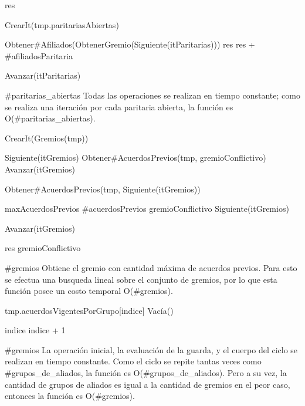 {
	\state res 		
	\state

	\state {} \asig CrearIt(tmp.paritariasAbiertas)		
						
		\state

		\state {} \asig Obtener\#Afiliados(ObtenerGremio(Siguiente(itParitarias)))		
		\state res \asig res + \#afiliadosParitaria		

		\state
		\state Avanzar(itParitarias)					
	\endwhile
}
{ \#paritarias\_abiertas }
{ Todas las operaciones se realizan en tiempo constante; como se realiza una iteración por cada paritaria abierta, la función es O(\#paritarias\_abiertas). }

{
	\state {} \asig CrearIt(Gremios(tmp))							
	\state

	\state {} \asig Siguiente(itGremios)							
	\state {} \asig Obtener\#AcuerdosPrevios(tmp, gremioConflictivo)				
	\state Avanzar(itGremios)																	
	\state

																	
		\state

		\state {} \asig Obtener\#AcuerdosPrevios(tmp, Siguiente(itGremios))		

									

			\state maxAcuerdosPrevios \asig \#acuerdosPrevios						
			\state gremioConflictivo \asig Siguiente(itGremios)			
		\endif

		\state
		\state Avanzar(itGremios)										
	\endwhile
	\state

	\state res \asig gremioConflictivo									
}
{\#gremios}
{Obtiene el gremio con cantidad m\'axima de acuerdos previos. Para esto se efectua una busqueda lineal sobre el conjunto de gremios, por lo que esta funci\'on posee un costo temporal O(\#gremios).}

{
	\state {} 									
				
		\state

		\state tmp.acuerdosVigentesPorGrupo[indice] \asig Vacía()		

		\state
		\state indice \asig indice + 1									
	\endwhile

}
{\#gremios}
{ La operación inicial, la evaluación de la guarda, y el cuerpo del ciclo se realizan en tiempo constante. Como el ciclo se repite tantas veces como \#grupos\_de\_aliados, la función es O(\#grupos\_de\_aliados). Pero a su vez, la cantidad de grupos de aliados es igual a la cantidad de gremios en el peor caso, entonces la función es O(\#gremios). }

